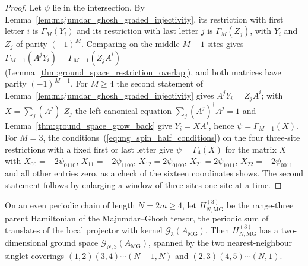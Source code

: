 \begin{proof}
    \leanok
    Let $\psi$ lie in the intersection. By
    Lemma~\ref{lem:majumdar_ghosh_graded_injectivity}, its restriction with
    first letter $i$ is $\Gamma_{M}(Y_i)$ and its restriction with last letter
    $j$ is $\Gamma_{M}(Z_j)$, with $Y_i$ and $Z_j$ of parity $(-1)^{M}$. Comparing
    on the middle $M-1$ sites gives
    $\Gamma_{M-1}(A^jY_i)=\Gamma_{M-1}(Z_jA^i)$
    (Lemma~\ref{thm:ground_space_restriction_overlap}), and both matrices have parity
    $(-1)^{M-1}$. For $M\ge4$ the second statement of
    Lemma~\ref{lem:majumdar_ghosh_graded_injectivity} gives $A^jY_i=Z_jA^i$; with
    $X=\sum_j(A^j)^\dagger Z_j$ the left-canonical equation
    $\sum_j(A^j)^\dagger A^j=1$ and
    Lemma~\ref{thm:ground_space_grow_back} give $Y_i=XA^i$, hence
    $\psi=\Gamma_{M+1}(X)$. For $M=3$, the
    conditions~(\ref{eq:mg_spin_half_conditions}) on the four three-site
    restrictions with a fixed first or last letter give $\psi=\Gamma_{4}(X)$ for
    the matrix $X$ with $X_{00}=-2\psi_{0110}$, $X_{11}=-2\psi_{1100}$,
    $X_{12}=2\psi_{0100}$, $X_{21}=2\psi_{1011}$, $X_{22}=-2\psi_{0011}$ and all
    other entries zero, as a check of the sixteen coordinates shows. The second
    statement follows by enlarging a window of three sites one site at a time.
\end{proof}

\begin{lemma}%
    \label{thm:majumdar_ghosh_ground_space}
    \leanok
    On an even periodic chain of length $N = 2m\ge4$, let
    $H_{N,\mathrm{MG}}^{(3)}$ be the range-three parent Hamiltonian of the
    Majumdar--Ghosh tensor, the periodic sum of translates of the local
    projector with kernel $\mathcal G_{3}(A_{\mathrm{MG}})$. Then
    $H_{N,\mathrm{MG}}^{(3)}$ has a two-dimensional ground space
    $\mathcal G_{N,3}(A_{\mathrm{MG}})$, spanned by the two nearest-neighbour
    singlet coverings $(1,2)(3,4)\cdots(N-1,N)$ and $(2,3)(4,5)\cdots(N,1)$.
\end{lemma}

